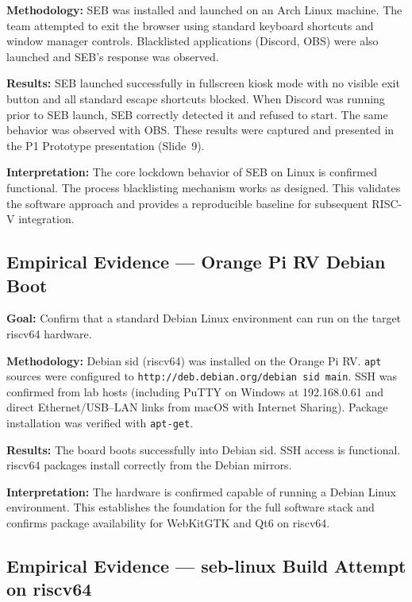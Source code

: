\documentclass[11pt]{article}
\begin{document}
\textbf{Methodology:} SEB was installed and launched on an Arch Linux machine. The team attempted to exit the browser using standard keyboard shortcuts and window manager controls. Blacklisted applications (Discord, OBS) were also launched and SEB's response was observed.

\textbf{Results:} SEB launched successfully in fullscreen kiosk mode with no visible exit button and all standard escape shortcuts blocked. When Discord was running prior to SEB launch, SEB correctly detected it and refused to start. The same behavior was observed with OBS. These results were captured and presented in the P1 Prototype presentation (Slide~9).

\textbf{Interpretation:} The core lockdown behavior of SEB on Linux is confirmed functional. The process blacklisting mechanism works as designed. This validates the software approach and provides a reproducible baseline for subsequent RISC-V integration.

\subsection{Empirical Evidence --- Orange Pi RV Debian Boot}
\label{sec:empirical-opi}

\textbf{Goal:} Confirm that a standard Debian Linux environment can run on the target riscv64 hardware.

\textbf{Methodology:} Debian sid (riscv64) was installed on the Orange Pi RV. \texttt{apt} sources were configured to \texttt{http://deb.debian.org/debian sid main}. SSH was confirmed from lab hosts (including PuTTY on Windows at 192.168.0.61 and direct Ethernet/USB--LAN links from macOS with Internet Sharing). Package installation was verified with \texttt{apt-get}.

\textbf{Results:} The board boots successfully into Debian sid. SSH access is functional. riscv64 packages install correctly from the Debian mirrors.

\textbf{Interpretation:} The hardware is confirmed capable of running a Debian Linux environment. This establishes the foundation for the full software stack and confirms package availability for WebKitGTK and Qt6 on riscv64.

\subsection{Empirical Evidence --- seb-linux Build Attempt on riscv64}
\label{sec:empirical-seblinux}
\end{document}
